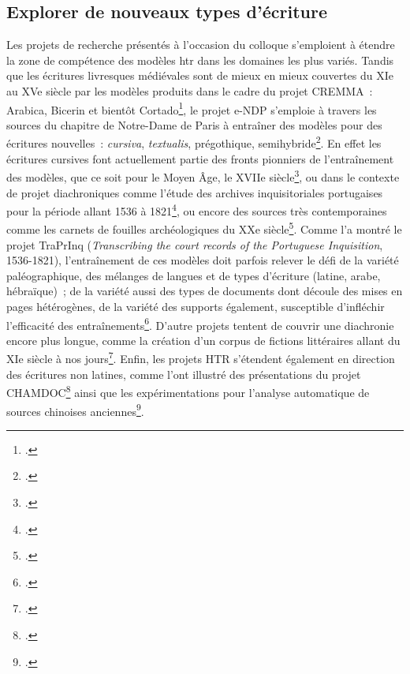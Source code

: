 \documentclass[a4paper,12pt,twoside]{book}
\begin{document}
		\subsection{Explorer de nouveaux types d'écriture}
		
		Les projets de recherche présentés à l'occasion du colloque s'emploient
		à étendre la zone de compétence des modèles \gls{htr} dans les domaines les
		plus variés. Tandis que les écritures livresques médiévales sont de
		mieux en mieux couvertes du XIe au XVe siècle par les modèles produits
		dans le cadre du projet CREMMA~: Arabica, Bicerin et bientôt Cortado\footcite{campsCremmaLabProjectsTranscription2022}, le projet e-NDP
		s'emploie à travers les sources du chapitre de Notre-Dame de Paris à
		entraîner des modèles pour des écritures nouvelles~: \textit{cursiva},
		\textit{textualis}, prégothique, semihybride\footcite{torresaguilarModelisationAffinageHTR2022}. En effet les écritures
		cursives font actuellement partie des fronts pionniers de l'entraînement
		des modèles, que ce soit pour le Moyen Âge, le XVIIe siècle\footcite{paupeCursive17eSiecle2022a}, ou dans le contexte de projet
		diachroniques comme l'étude des archives inquisitoriales portugaises
		pour la période allant 1536 à 1821\footcite{baudryArchivesInquisitorialesPortugal2022}, ou encore des sources
		très contemporaines comme les carnets de fouilles archéologiques du XXe
		siècle\footcite{tufferyRetourExperiencesUtilisation2022}. Comme l'a montré
		le projet TraPrInq (\textit{Transcribing the court records of the
			Portuguese Inquisition}, 1536-1821), l'entraînement de ces modèles doit
		parfois relever le défi de la variété paléographique, des mélanges de
		langues et de types d'écriture (latine, arabe, hébraïque)~; de la
		variété aussi des types de documents dont découle des mises en pages
		hétérogènes, de la variété des supports également, susceptible
		d'infléchir l'efficacité des entraînements\footcite{baudryArchivesInquisitorialesPortugal2022}. D'autre projets
		tentent de couvrir une diachronie encore plus longue, comme la création
		d'un corpus de fictions littéraires allant du XIe siècle à nos jours\footcite{campsCremmaLabProjectsTranscription2022}. Enfin, les projets HTR
		s'étendent également en direction des écritures non latines, comme l'ont
		illustré des présentations du projet CHAMDOC\footcite{schweyerAnalyseReconnaissanceIndexation2022} ainsi que les
		expérimentations pour l'analyse automatique de sources chinoises
		anciennes\footcite{bizais-lilligExperimentationsPourAnalyse2022}.
		
\end{document}
